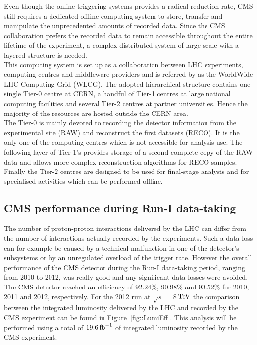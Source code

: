 Even though the online triggering systems provides a radical reduction rate, CMS still requires a dedicated offline computing system to store, transfer and manipulate the unprecedented amounts of recorded data. Since the CMS collaboration prefers the recorded data to remain accessible throughout the entire lifetime of the experiment, a complex distributed system of large scale with a layered structure is needed.
\\
This computing system is set up as a collaboration between LHC experiments, computing centres and middleware providers and is referred by as the WorldWide LHC Computing Grid (WLCG). The adopted hierarchical structure contains one single Tier-0 centre at CERN, a handful of Tier-1 centres at large national computing facilities and several Tier-2 centres at partner universities. Hence the majority of the resources are hosted outside the CERN area. 
\\
The Tier-0 is mainly devoted to recording the detector information from the experimental site (RAW) and reconstruct the first datasets (RECO). It is the only one of the computing centres which is not accessible for analysis use. The following layer of Tier-1's provides storage of a second complete copy of the RAW data and allows more complex reconstruction algorithms for RECO samples. Finally the Tier-2 centres are designed to be used for final-stage analysis and for specialised activities which can be performed offline.

\subsection{CMS performance during Run-I data-taking} \label{subsec::CMSPerf}

The number of proton-proton interactions delivered by the LHC can differ from the number of interactions actually recorded by the experiments. 
Such a data loss can for example be caused by a technical malfunction in one of the detector's subsystems or by an unregulated overload of the trigger rate. However the overall performance of the CMS detector during the Run-I data-taking period, ranging from 2010 to 2012, was really good and any significant data-losses were avoided. 
The CMS detector reached an efficiency of 92.24$\%$, 90.98$\%$ and 93.52$\%$ for 2010, 2011 and 2012, respectively. 
For the 2012 run at $\sqrt{s}$ = 8$\, \mathrm{TeV}$ the comparison between the integrated luminosity delivered by the LHC and recorded by the CMS experiment can be found in Figure~\ref{fig::LumiEff}. This analysis will be performed using a total of $19.6 \, \mathrm{fb}^{-1}$ of integrated luminosity recorded by the CMS experiment.

